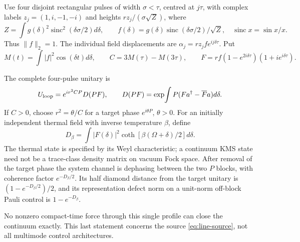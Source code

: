 Use four disjoint rectangular pulses of width $\sigma<\tau$, centred
at $j\tau$, with complex labels $z_j=(1,i,-1,-i)$ and heights
$r z_j/(\sigma\sqrt Z)$, where
\[
 Z=\int g(\delta)^2\operatorname{sinc}^2(\delta\sigma/2)d\delta,\qquad
 f(\delta)=g(\delta)\operatorname{sinc}(\delta\sigma/2)/\sqrt Z,
 \quad \operatorname{sinc}x=\sin x/x .
\]
Thus $\|f\|_2=1$. The individual field displacements are
$\alpha_j=r z_j f e^{ij\delta\tau}$.
Put
\[
 M(t)=\int|f|^2\cos(\delta t)d\delta,\qquad
 C=3M(\tau)-M(3\tau),\qquad
 F=r f(1-e^{2i\delta\tau})(1+ie^{i\delta\tau}).
\]

\begin{proposition}
\label{prop:thermal-loop}
The complete four-pulse unitary is
\begin{equation}\label{eq:thermal-loop}
 U_{\rm loop}=e^{ir^2CP}D(PF),\qquad
 D(PF)=\exp\!\int P(Fa^\dagger-\overline F a)d\delta .
\end{equation}
If $C>0$, choose $r^2=\theta/C$ for a target phase
$e^{i\theta P}$, $\theta>0$. For an initially independent thermal
field with inverse temperature $\beta$, define
\begin{equation}\label{eq:thermal-D}
 D_\beta=\int |F(\delta)|^2
       \coth\!\left[\beta(\Omega+\delta)/2\right]d\delta .
\end{equation}
The thermal state is specified by its Weyl characteristic; a continuum
KMS state need not be a trace-class density matrix on vacuum Fock space.
After removal of the target phase the system channel is dephasing
between the two $P$ blocks, with coherence factor $e^{-D_\beta/2}$.
Its half diamond distance from the target unitary is
$(1-e^{-D_\beta/2})/2$, and its representation defect norm on a
unit-norm off-block Pauli control is $1-e^{-D_\beta}$.

No nonzero compact-time force through this single profile can close the
continuum exactly. This last statement concerns the source
\eqref{eq:line-source}, not all multimode control architectures.
\end{proposition}
